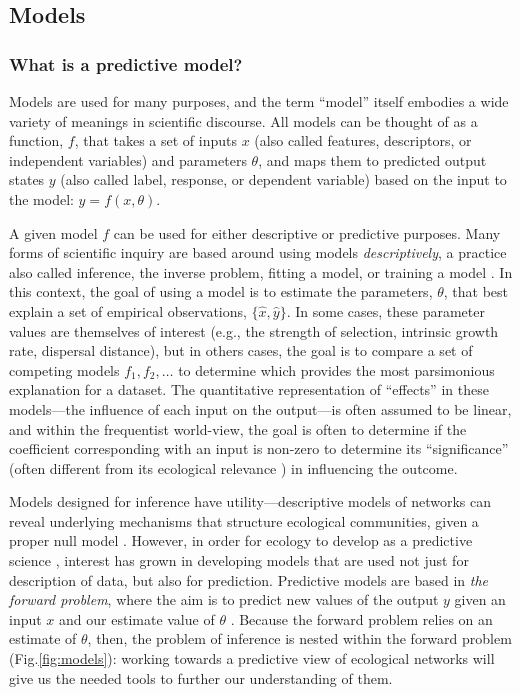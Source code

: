 \subsection{Models}\label{models}

\subsubsection{What is a predictive
model?}\label{what-is-a-predictive-model}

Models are used for many purposes, and the term ``model'' itself
embodies a wide variety of meanings in scientific discourse. All models
can be thought of as a function, \(f\), that takes a set of inputs \(x\)
(also called features, descriptors, or independent variables) and
parameters \(\theta\), and maps them to predicted output states \(y\)
(also called label, response, or dependent variable) based on the input
to the model: \(y=f(x,\theta)\).

A given model \(f\) can be used for either descriptive or predictive
purposes. Many forms of scientific inquiry are based around using models
\emph{descriptively}, a practice also called inference, the inverse
problem, fitting a model, or training a model \cite{Stouffer2019AllEco}.
In this context, the goal of using a model is to estimate the
parameters, \(\theta\), that best explain a set of empirical
observations, \(\{\hat{x}, \hat{y}\}\). In some cases, these parameter
values are themselves of interest (e.g., the strength of selection,
intrinsic growth rate, dispersal distance), but in others cases, the
goal is to compare a set of competing models \(f_1, f_2, \dots\) to
determine which provides the most parsimonious explanation for a
dataset. The quantitative representation of ``effects'' in these
models---the influence of each input on the output---is often assumed to
be linear, and within the frequentist world-view, the goal is often to
determine if the coefficient corresponding with an input is non-zero to
determine its ``significance'' (often different from its ecological
relevance \cite{Martinez-Abrain2008StaSig}) in influencing the outcome.

Models designed for inference have utility---descriptive models of
networks can reveal underlying mechanisms that structure ecological
communities, given a proper null model \cite{Connor2017UsiNul}. However,
in order for ecology to develop as a predictive science
\cite{Evans2012PreEco}, interest has grown in developing models that are
used not just for description of data, but also for prediction.
Predictive models are based in \emph{the forward problem}, where the aim
is to predict new values of the output \(y\) given an input \(x\) and
our estimate value of \(\theta\) \cite{Stouffer2019AllEco}. Because the
forward problem relies on an estimate of \(\theta\), then, the problem
of inference is nested within the forward problem (Fig.\ref{fig:models}): working
towards a predictive view of ecological networks will give us the needed
tools to further our understanding of them.


